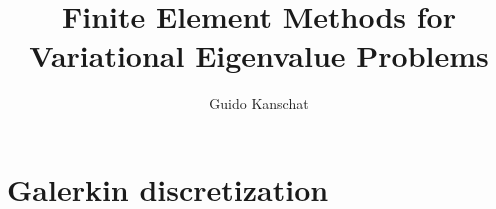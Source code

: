 \documentclass{amsproc}
\title{Finite Element Methods for Variational Eigenvalue Problems}
\author{Guido Kanschat}
\begin{document}
\maketitle
\tableofcontents
\section{Galerkin discretization}

\end{document}
